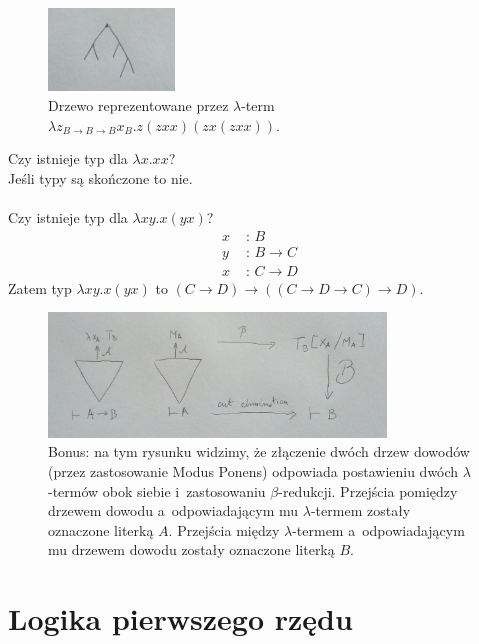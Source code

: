 \documentclass[10pt,a4paper]{article}
\theoremstyle{plain}
\theoremstyle{definition}
\newcommand{\impl}{\rightarrow}
\begin{document}
\begin{figure}[!h]
\caption{Drzewo reprezentowane przez $\lambda$-term
$\lambda z_{B\impl B\impl B} x_B . z(zxx)(zx(zxx))$.}
\label{lambdaDrzewo}
\centering \includegraphics[width=0.3\textwidth]{img/lambdaTermJakoDrzewo}
\end{figure}

\noindent Czy istnieje typ dla $\lambda x . xx$?\\
Jeśli typy są skończone to nie.\\
\\
Czy istnieje typ dla $\lambda xy . x(yx)$?
\begin{align*}
x &\text{ : } B\\
y &\text{ : } B \impl C\\
x &\text{ : } C \impl D
\end{align*}
Zatem typ $\lambda xy . x(yx)$ to $(C\impl D)\impl((C\impl D \impl C)\impl D)$.

\begin{figure}[H]
\caption{Bonus: na tym rysunku widzimy, że złączenie dwóch drzew dowodów
(przez zastosowanie Modus Ponens) odpowiada postawieniu dwóch $\lambda$-termów
obok siebie i~zastosowaniu $\beta$-redukcji. Przejścia pomiędzy drzewem dowodu
a~odpowiadającym mu $\lambda$-termem zostały oznaczone literką $A$. Przejścia
między $\lambda$-termem a~odpowiadającym mu drzewem dowodu zostały oznaczone
literką $B$.}
\centering \includegraphics[width=0.8\textwidth]{img/rysunekWKtorymNieWiemOCoChodzi}
\end{figure}

\section{Logika pierwszego rzędu}
\end{document}
